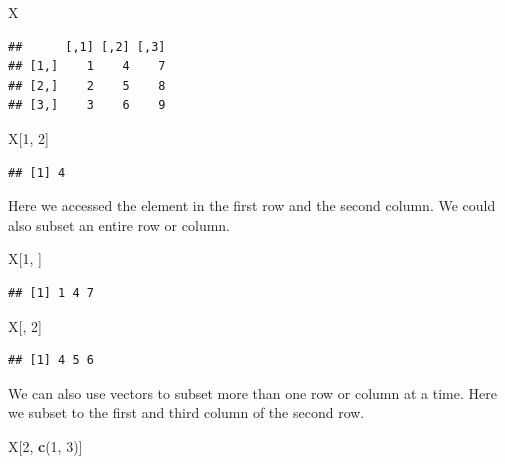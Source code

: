 \documentclass[]{book}
\newenvironment{Shaded}{\begin{snugshade}}{\end{snugshade}}
\newcommand{\KeywordTok}[1]{\textcolor[rgb]{0.13,0.29,0.53}{\textbf{#1}}}
\newcommand{\DecValTok}[1]{\textcolor[rgb]{0.00,0.00,0.81}{#1}}
\newcommand{\NormalTok}[1]{#1}
\theoremstyle{definition}
\theoremstyle{definition}
\theoremstyle{definition}
\theoremstyle{remark}
\begin{document}
\begin{Shaded}
\begin{Highlighting}[]
\NormalTok{X}
\end{Highlighting}
\end{Shaded}

\begin{verbatim}
##      [,1] [,2] [,3]
## [1,]    1    4    7
## [2,]    2    5    8
## [3,]    3    6    9
\end{verbatim}

\begin{Shaded}
\begin{Highlighting}[]
\NormalTok{X[}\DecValTok{1}\NormalTok{, }\DecValTok{2}\NormalTok{]}
\end{Highlighting}
\end{Shaded}

\begin{verbatim}
## [1] 4
\end{verbatim}

Here we accessed the element in the first row and the second column. We
could also subset an entire row or column.

\begin{Shaded}
\begin{Highlighting}[]
\NormalTok{X[}\DecValTok{1}\NormalTok{, ]}
\end{Highlighting}
\end{Shaded}

\begin{verbatim}
## [1] 1 4 7
\end{verbatim}

\begin{Shaded}
\begin{Highlighting}[]
\NormalTok{X[, }\DecValTok{2}\NormalTok{]}
\end{Highlighting}
\end{Shaded}

\begin{verbatim}
## [1] 4 5 6
\end{verbatim}

We can also use vectors to subset more than one row or column at a time.
Here we subset to the first and third column of the second row.

\begin{Shaded}
\begin{Highlighting}[]
\NormalTok{X[}\DecValTok{2}\NormalTok{, }\KeywordTok{c}\NormalTok{(}\DecValTok{1}\NormalTok{, }\DecValTok{3}\NormalTok{)]}
\end{Highlighting}
\end{Shaded}
\end{document}
